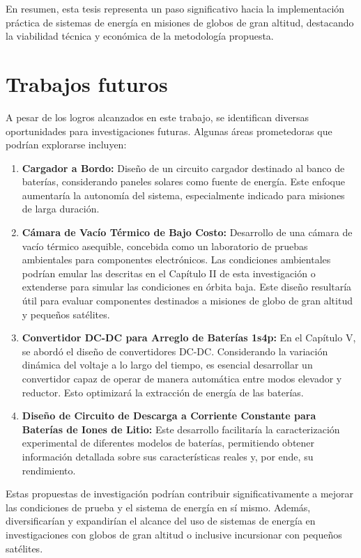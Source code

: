 En resumen, esta tesis representa un paso significativo hacia la implementación práctica de sistemas de energía en misiones de globos de gran altitud, destacando la viabilidad técnica y económica de la metodología propuesta.







\newpage
\section{Trabajos futuros}

A pesar de los logros alcanzados en este trabajo, se identifican diversas oportunidades para investigaciones futuras. Algunas áreas prometedoras que podrían explorarse incluyen:

\begin{enumerate}
    \item \textbf{Cargador a Bordo:} Diseño de un circuito cargador destinado al banco de baterías, considerando paneles solares como fuente de energía. Este enfoque aumentaría la autonomía del sistema, especialmente indicado para misiones de larga duración.

    \item \textbf{Cámara de Vacío Térmico de Bajo Costo:} Desarrollo de una cámara de vacío térmico asequible, concebida como un laboratorio de pruebas ambientales para componentes electrónicos. Las condiciones ambientales podrían emular las descritas en el Capítulo II de esta investigación o extenderse para simular las condiciones en órbita baja. Este diseño resultaría útil para evaluar componentes destinados a misiones de globo de gran altitud y pequeños satélites.

    \item \textbf{Convertidor DC-DC para Arreglo de Baterías 1s4p:} En el Capítulo V, se abordó el diseño de convertidores DC-DC. Considerando la variación dinámica del voltaje a lo largo del tiempo, es esencial desarrollar un convertidor capaz de operar de manera automática entre modos elevador y reductor. Esto optimizará la extracción de energía de las baterías.

    \item \textbf{Diseño de Circuito de Descarga a Corriente Constante para Baterías de Iones de Litio:} Este desarrollo facilitaría la caracterización experimental de diferentes modelos de baterías, permitiendo obtener información detallada sobre sus características reales y, por ende, su rendimiento.

\end{enumerate}

Estas propuestas de investigación podrían contribuir significativamente a mejorar las condiciones de prueba y el sistema de energía en sí mismo. Además, diversificarían y expandirían el alcance del uso de sistemas de energía en investigaciones con globos de gran altitud o inclusive incursionar con pequeños satélites.



